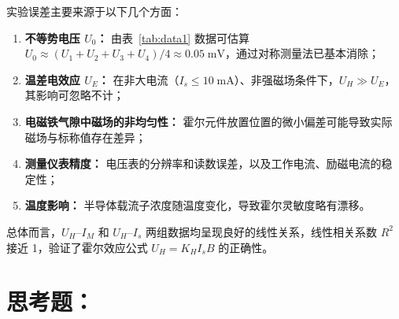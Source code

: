 实验误差主要来源于以下几个方面：

\begin{enumerate}[label=(\arabic*), leftmargin=3em]
    \item \textbf{不等势电压 $U_0$：} 由表~\ref{tab:data1} 数据可估算 $U_0 \approx (U_1+U_2+U_3+U_4)/4 \approx 0.05\;\text{mV}$，通过对称测量法已基本消除；
    \item \textbf{温差电效应 $U_E$：} 在非大电流（$I_s \leq 10\;\text{mA}$）、非强磁场条件下，$U_H \gg U_E$，其影响可忽略不计；
    \item \textbf{电磁铁气隙中磁场的非均匀性：} 霍尔元件放置位置的微小偏差可能导致实际磁场与标称值存在差异；
    \item \textbf{测量仪表精度：} 电压表的分辨率和读数误差，以及工作电流、励磁电流的稳定性；
    \item \textbf{温度影响：} 半导体载流子浓度随温度变化，导致霍尔灵敏度略有漂移。
\end{enumerate}

\noindent 总体而言，$U_H$--$I_M$ 和 $U_H$--$I_s$ 两组数据均呈现良好的线性关系，线性相关系数 $R^2$ 接近 1，验证了霍尔效应公式 $U_H = K_H I_s B$ 的正确性。

\section{思考题：}

